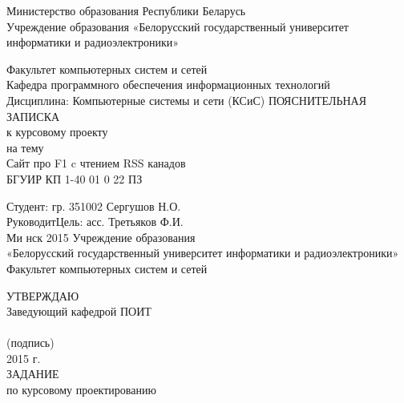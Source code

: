 \documentclass[14pt,a4paper]{extreport}
\title{}
\author{}
\begin{document}
	\center
	Министерство образования Республики Беларусь\\
	Учреждение образования «Белорусский государственный университет информатики и радиоэлектроники»
	\vspace*{2cm}
	\endcenter
	\raggedright
	Факультет компьютерных систем и сетей\\
	\medskip
	Кафедра программного обеспечения информационных технологий\\
	\medskip
	Дисциплина:  Компьютерные системы и сети (КСиС)
	\vspace*{2cm}
	\center
	ПОЯСНИТЕЛЬНАЯ ЗАПИСКА\\
	к курсовому проекту\\
	на тему\\
	\medskip
	Сайт про F1 c чтением RSS канадов\\
	\medskip
	БГУИР КП  1-40 01 0 22 ПЗ
	\vspace*{4cm}
	\endcenter
	\raggedright
	\hspace*{7.94cm} Студент: гр. 351002 Сергушов Н.О.\\
	\bigskip
	\hspace*{7.94cm}РуководитЦель: асс. Третьяков Ф.И.\\
	\center
	\vspace*{2cm}
	Ми	нск 2015
	\pagestyle{empty}
	\newpage
	\center
	Учреждение образования\\
	\medskip
	«Белорусский государственный университет информатики и радиоэлектроники»\\
	\medskip
	Факультет компьютерных систем и сетей\\
	\medskip
	\endcenter
	\raggedright
	\hspace*{9.53cm}УТВЕРЖДАЮ\\
	\hspace*{9.53cm}Заведующий кафедрой ПОИТ\\
	\hspace*{9.53cm}\underline{\hspace{6cm}} \\
	\hspace*{11cm}\small (подпись) \normalsize\\
	\hspace*{9.53cm}\underline{\hspace{5cm}}2015 г.\\
	\medskip
	\center
	ЗАДАНИЕ\\
	по курсовому проектированию\\
	\medskip
\end{document}

